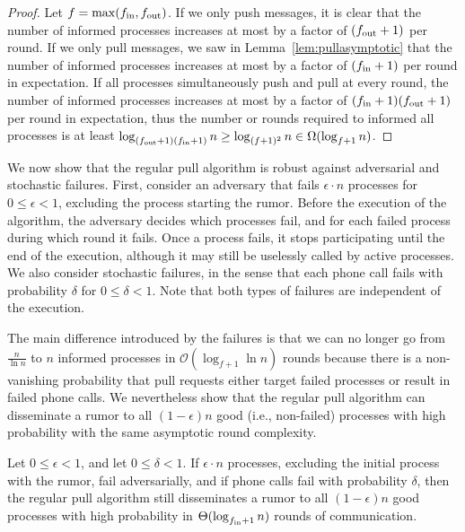 \begin{proof}
Let $f=\max(f_\text{in},f_\text{out})$. 
If we only push messages, it is clear that the number of informed processes increases at most by a factor of $(f_\text{out} + 1)$ per round. If we only pull messages, we saw in Lemma~\ref{lem:pullasymptotic}
  that the number of informed processes increases at most by a factor of $(f_\text{in} + 1)$ per round in
  expectation. If all processes simultaneously push and pull at every round, the number of informed processes
  increases at most by a factor of $(f_\text{in} + 1)(f_\text{out} + 1)$ per round in expectation, thus the number or
  rounds required to informed all processes is at least
  $\log_{(f_\text{out}+1)(f_\text{in}+1)} n \geq \log_{(f+1)^2} n \in \Omega(\log_{f+1} n)$.

\end{proof}


We now show that the regular pull algorithm is robust against adversarial and stochastic failures.  First, consider an adversary that fails $\epsilon \cdot n$ processes for $0 \leq \epsilon < 1$, excluding the process starting the rumor. Before the execution of the algorithm, the adversary decides which processes fail, and for each failed process during which round it fails. Once a process fails, it stops participating until the end of the execution, although it may still be uselessly called by active processes. We also consider stochastic failures, in the sense that each phone call fails with probability $\delta$ for $0 \leq \delta < 1$. Note that both types of failures are independent of the execution.%

The main difference introduced by the failures is that we can no longer go from $\frac{n}{\ln n}$ to $n$ informed processes in $\mathcal{O}(\log_{f+1} \ln n)$ rounds because there is a non-vanishing probability that pull requests either target failed processes or result in failed phone calls. We nevertheless show that the regular pull algorithm can disseminate a rumor to all $(1-\epsilon)n$ good (i.e., non-failed) processes with high probability with the same asymptotic round complexity. 

\begin{theorem}
  \label{thm:failures}
  Let $0 \leq \epsilon < 1$, and let $0 \leq \delta < 1$. If $\epsilon \cdot n$ processes, excluding the initial process with the rumor, fail adversarially, and if phone calls fail with probability $\delta$, then the regular pull algorithm still disseminates a rumor to all $(1-\epsilon)n$ good processes with high probability in $\Theta(\log_{f_\text{in} + 1} n)$ rounds of communication.
\end{theorem}

